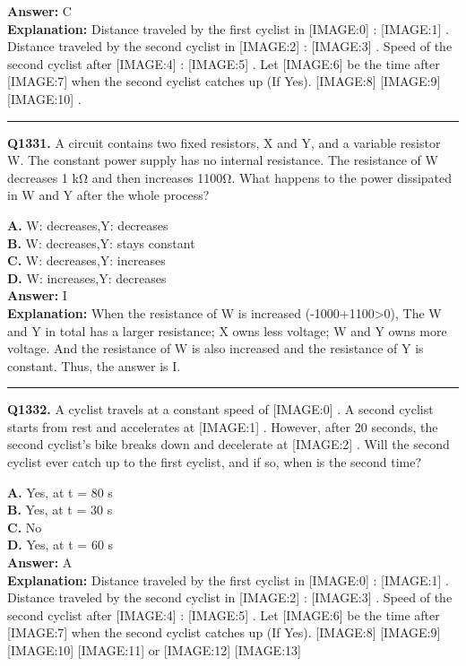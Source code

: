 \documentclass[12pt]{article}
\begin{document}
\textbf{Answer:} C \\
\textbf{Explanation:} Distance traveled by the first cyclist in
[IMAGE:0]
:
[IMAGE:1]
.
Distance traveled by the second cyclist in
[IMAGE:2]
:
[IMAGE:3]
.
Speed of the second cyclist after
[IMAGE:4]
:
[IMAGE:5]
.
Let
[IMAGE:6]
be the time after
[IMAGE:7]
when the second cyclist catches up (If Yes).
[IMAGE:8]
[IMAGE:9]
[IMAGE:10]
.

\hrule
\vspace{1em}


\noindent
\textbf{Q1331.} A circuit contains two fixed resistors, X and Y, and a variable resistor W. The constant power supply has no internal resistance.
The resistance of W decreases 1 kΩ and then increases 1100Ω. What happens to the power dissipated in W and Y after the whole process?



\textbf{A.} W: decreases,Y: decreases \\
\textbf{B.} W: decreases,Y: stays constant \\
\textbf{C.} W: decreases,Y: increases \\
\textbf{D.} W: increases,Y: decreases \\

\textbf{Answer:} I \\
\textbf{Explanation:} When the resistance of W is increased (-1000+1100>0), The W and Y in total has a larger resistance; X owns less voltage; W and Y owns more voltage. And the resistance of W is also increased and the resistance of Y is constant. Thus, the answer is I.

\hrule
\vspace{1em}


\noindent
\textbf{Q1332.} A cyclist travels at a constant speed of
[IMAGE:0]
. A second cyclist starts from rest and accelerates at
[IMAGE:1]
. However, after 20 seconds, the second cyclist's bike breaks down and decelerate at
[IMAGE:2]
. Will the second cyclist ever catch up to the first cyclist, and if so, when is the second time?



\textbf{A.} Yes, at t = 80 s \\
\textbf{B.} Yes, at t = 30 s \\
\textbf{C.} No \\
\textbf{D.} Yes, at t = 60 s \\

\textbf{Answer:} A \\
\textbf{Explanation:} Distance traveled by the first cyclist in
[IMAGE:0]
:
[IMAGE:1]
.
Distance traveled by the second cyclist in
[IMAGE:2]
:
[IMAGE:3]
.
Speed of the second cyclist after
[IMAGE:4]
:
[IMAGE:5]
.
Let
[IMAGE:6]
be the time after
[IMAGE:7]
when the second cyclist catches up (If Yes).
[IMAGE:8]
[IMAGE:9]
[IMAGE:10]
[IMAGE:11]
or
[IMAGE:12]
[IMAGE:13]
\end{document}
